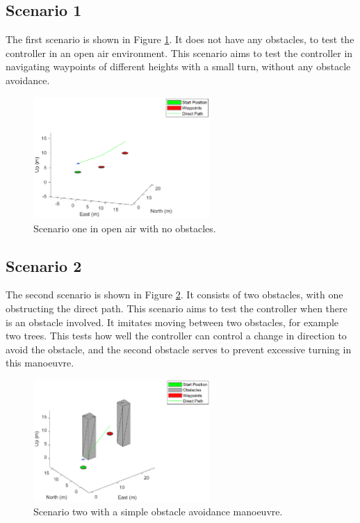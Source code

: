 \subsection{Scenario 1}
The first scenario is shown in Figure \ref{fig:3_3_scenario1}. It does not have any obstacles, to test the controller in an open air environment. This scenario aims to test the controller in navigating waypoints of different heights with a small turn, without any obstacle avoidance. 
\begin{figure}[H]
    \centering
    \includegraphics[width = 0.6\textwidth]{./img/3_3_scenario1}
    \caption{Scenario one in open air with no obstacles.}
    \label{fig:3_3_scenario1}
\end{figure}

\subsection{Scenario 2}
The second scenario is shown in Figure \ref{fig:3_3_scenario2}. It consists of two obstacles, with one obstructing the direct path. This scenario aims to test the controller when there is an obstacle involved. It imitates moving between two obstacles, for example two trees. This tests how well the controller can control a change in direction to avoid the obstacle, and the second obstacle serves to prevent excessive turning in this manoeuvre.
\begin{figure}[H]
    \centering
    \includegraphics[width = 0.6\textwidth]{./img/3_3_scenario2}
    \caption{Scenario two with a simple obstacle avoidance manoeuvre.}
    \label{fig:3_3_scenario2}
\end{figure}

